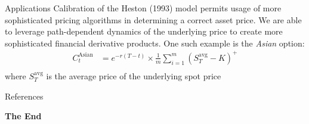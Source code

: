 \documentclass[aspectratio=169,xcolor=dvipsnames]{beamer}
\begin{document}
	\begin{frame}{Applications}
	Calibration of the Heston (1993) model permits usage of more sophisticated pricing algorithms in determining a correct asset price. We are able to leverage path-dependent dynamics of the underlying price to create more sophisticated financial derivative products. One such example is the \textit{Asian} option:
		\begin{align}
			C^{\text{Asian}}_t &= e^{-r(T-t)} \times \frac{1}{m} \sum_{i=1}^{m} (S_{T}^{\text{avg}} - K)^{+} \\
		\end{align}
		where $S_{T}^{\text{avg}}$ is the average price of the underlying spot price
	\end{frame}
	
	\begin{frame}{References}
		\nocite{*}
		\printbibliography
	\end{frame}
	
	
	\begin{frame}
		\Huge{\centerline{\textbf{The End}}}
	\end{frame}
	
	
\end{document}
